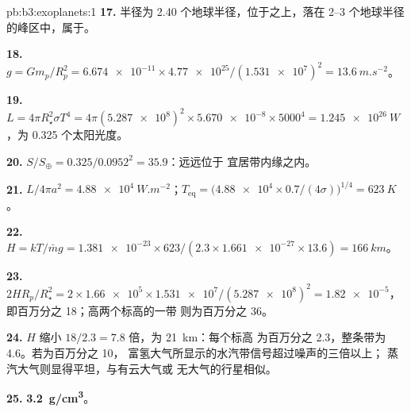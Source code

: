 \begin{solution}{pb:b3:exoplanets:1}
\textbf{17.} 半径为 2.40 个地球半径，位于之上，落在 2--3 个地球半径
的峰区中，属于。

\textbf{18.} $g = Gm_p/R_p^2 = \num{6.674e-11}\times\num{4.77e25}/(\num{1.531e7})^2 =
\qty{13.6}{m.s^{-2}}$。

\textbf{19.} $L = 4\pi R_\star^2\sigma T^4 = 4\pi(\num{5.287e8})^2\times\num{5.670e-8}
\times5000^4 = \qty{1.245e26}{W}$，为 0.325 个太阳光度。

\textbf{20.} $S/S_\oplus = 0.325/0.0952^2 = 35.9$：远远位于
宜居带内缘之内。

\textbf{21.} $L/4\pi a^2 = \qty{4.88e4}{W.m^{-2}}$；$T_\mathrm{eq} =
\bigl(\num{4.88e4}\times0.7/(4\sigma)\bigr)^{1/4} = \qty{623}{K}$。

\textbf{22.} $H = kT/\bar m g = \num{1.381e-23}\times623/(2.3\times\num{1.661e-27}
\times13.6) = \qty{166}{km}$。

\textbf{23.} $2HR_p/R_\star^2 = 2\times\num{1.66e5}\times\num{1.531e7}/
(\num{5.287e8})^2 = \num{1.82e-5}$，即百万分之 18；高两个标高的一带
则为百万分之 36。

\textbf{24.} $H$ 缩小 $18/2.3 = 7.8$ 倍，为 \qty{21}{km}：每个标高
为百万分之 2.3，整条带为 4.6。若为百万分之 10，
富氢大气所显示的水汽带信号超过噪声的三倍以上；
蒸汽大气则显得平坦，与有云大气或
无大气的行星相似。

\textbf{25.} \textbf{\qty[text-series-to-math=true]{3.2}{g/cm^3}}。
\end{solution}
